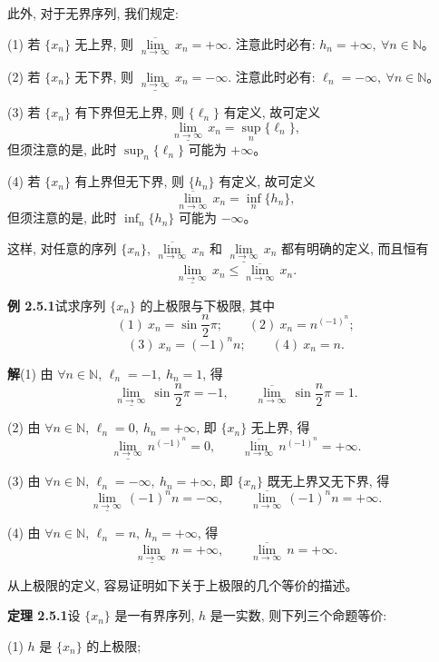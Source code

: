 \documentclass[UTF8,12pt,a4paper,fontset=fandol]{ctexart}
\begin{document}
此外, 对于无界序列, 我们规定:

(1) 若 $\{x_n\}$ 无上界, 则 $\overline{\lim\limits_{n\to\infty}}\,x_n=+\infty$. 注意此时必有: $h_n=+\infty,\ \forall n\in\mathbb{N}$。

(2) 若 $\{x_n\}$ 无下界, 则 $\underline{\lim\limits_{n\to\infty}}\,x_n=-\infty$. 注意此时必有: $\ell_n=-\infty,\ \forall n\in\mathbb{N}$。

(3) 若 $\{x_n\}$ 有下界但无上界, 则 $\{\ell_n\}$ 有定义, 故可定义
\[
  \underline{\lim_{n\to\infty}}\,x_n=\sup_n\{\ell_n\},
\]
但须注意的是, 此时 $\sup_n\{\ell_n\}$ 可能为 $+\infty$。

(4) 若 $\{x_n\}$ 有上界但无下界, 则 $\{h_n\}$ 有定义, 故可定义
\[
  \overline{\lim_{n\to\infty}}\,x_n=\inf_n\{h_n\},
\]
但须注意的是, 此时 $\inf_n\{h_n\}$ 可能为 $-\infty$。

这样, 对任意的序列 $\{x_n\}$, $\overline{\lim\limits_{n\to\infty}}\,x_n$ 和 $\underline{\lim\limits_{n\to\infty}}\,x_n$ 都有明确的定义, 而且恒有
\[
  \underline{\lim_{n\to\infty}}\,x_n
  \leqslant
  \overline{\lim_{n\to\infty}}\,x_n.
\]

\noindent\textbf{例 2.5.1}\quad 试求序列 $\{x_n\}$ 的上极限与下极限, 其中
\[
  (1)\ x_n=\sin\frac n2\pi;\qquad
  (2)\ x_n=n^{(-1)^n};
\]
\[
  (3)\ x_n=(-1)^n n;\qquad
  (4)\ x_n=n.
\]

\noindent\textbf{解}\quad (1) 由 $\forall n\in\mathbb{N}$, $\ell_n=-1,\ h_n=1$, 得
\[
  \underline{\lim_{n\to\infty}}\,\sin\frac n2\pi=-1,
  \qquad
  \overline{\lim_{n\to\infty}}\,\sin\frac n2\pi=1.
\]

(2) 由 $\forall n\in\mathbb{N}$, $\ell_n=0,\ h_n=+\infty$, 即 $\{x_n\}$ 无上界, 得
\[
  \underline{\lim_{n\to\infty}}\, n^{(-1)^n}=0,
  \qquad
  \overline{\lim_{n\to\infty}}\, n^{(-1)^n}=+\infty.
\]

(3) 由 $\forall n\in\mathbb{N}$, $\ell_n=-\infty,\ h_n=+\infty$, 即 $\{x_n\}$ 既无上界又无下界, 得
\[
  \underline{\lim_{n\to\infty}}\,(-1)^n n=-\infty,
  \qquad
  \overline{\lim_{n\to\infty}}\,(-1)^n n=+\infty.
\]

(4) 由 $\forall n\in\mathbb{N}$, $\ell_n=n,\ h_n=+\infty$, 得
\[
  \underline{\lim_{n\to\infty}}\, n=+\infty,
  \qquad
  \overline{\lim_{n\to\infty}}\, n=+\infty.
\]

从上极限的定义, 容易证明如下关于上极限的几个等价的描述。

\noindent\textbf{定理 2.5.1}\quad 设 $\{x_n\}$ 是一有界序列, $h$ 是一实数, 则下列三个命题等价:

(1) $h$ 是 $\{x_n\}$ 的上极限;
\end{document}
